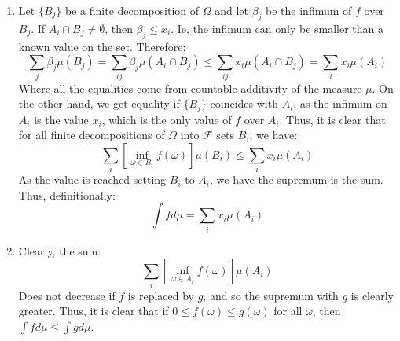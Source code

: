 \documentclass[12pt,a4paper]{article}
\newcommand{\1}[1]{\mathbbm{1}\left\{ #1 \right\}}
\newcommand{\fcal}{\mathcal{F}}
\begin{document}
\begin{enumerate}
	\item Let $\{B_j\}$ be a finite decomposition of $\Omega$ and let $\beta_j$ be the infimum of $f$ over $B_j$. If $A_i \cap B_j \neq \emptyset$, then $\beta_j \leq x_i$. Ie, the infimum can only be smaller than a known value on the set. Therefore:
	$$
		\sum_j \beta_j \mu(B_j) = \sum_{ij} \beta_j \mu(A_i \cap B_j) \leq
		\sum_{ij} x_i \mu(A_i \cap B_j) = \sum_i x_i \mu(A_i)
	$$
	Where all the equalities come from countable additivity of the measure $\mu$. On the other hand, we get equality if $\{B_j\}$ coincides with $A_i$, as the infimum on $A_i$ is the value $x_i$, which is the only value of $f$ over $A_i$. Thus, it is clear that for all finite decompositions of $\Omega$ into $\fcal$ sets $B_i$, we have:
	$$
		\sum_i\left[\inf_{\omega \in B_i} f(\omega)\right]\mu(B_i) \leq
		\sum_i x_i \mu(A_i)
	$$
	As the value is reached setting $B_i$ to $A_i$, we have the supremum is the sum. Thus, definitionally:
	$$
		\int f d\mu = \sum_i x_i \mu(A_i)
	$$
	
	\item Clearly, the sum:
	$$
		\sum_i\left[\inf_{\omega \in A_i} f(\omega)\right]\mu(A_i)
	$$
	Does not decrease if $f$ is replaced by $g$, and so the supremum with $g$ is clearly greater. Thus, it is clear that
	if $0 \leq f(\omega) \leq g(\omega)$ for all $\omega$, then $\int f d\mu \leq \int g d\mu$.
	

\end{enumerate}
\end{document}
